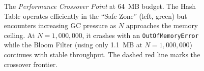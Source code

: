 \begin{figure}[t]
\caption{The \emph{Performance Crossover Point} at 64~MB budget. The Hash Table operates efficiently in the ``Safe Zone'' (left, green) but encounters increasing GC pressure as $N$ approaches the memory ceiling. At $N = 1{,}000{,}000$, it crashes with an \texttt{OutOfMemoryError} while the Bloom Filter (using only 1.1~MB at $N = 1{,}000{,}000$) continues with stable throughput. The dashed red line marks the crossover frontier.}
\label{fig:crossover}
\end{figure}
